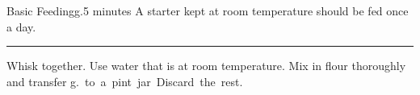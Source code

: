 \begin{recipe}{Basic Feeding}{\unit[225]{g.}}{5 minutes}
\freeform A starter kept at room temperature should be fed once a day.\\
\rule{\textwidth}{0.05pt}
\hspace*{10mm}
Whisk together. Use water that is at room temperature.
Mix in flour thoroughly and transfer \unit[225]{g.} to a pint jar. Discard the rest.
\end{recipe}
